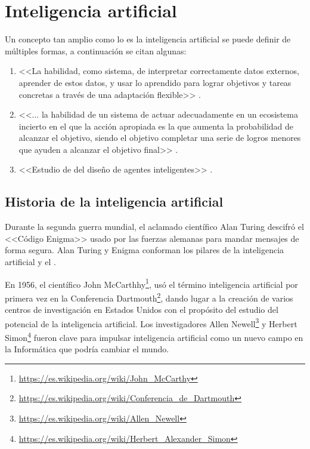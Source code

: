 
\section{Inteligencia artificial}

Un concepto tan amplio como lo es la inteligencia artificial se puede definir de múltiples formas, a continuación se citan algunas:

\begin{enumerate}
    \item <<La habilidad, como sistema, de interpretar correctamente datos externos, aprender de estos datos, y usar lo aprendido para lograr objetivos y tareas concretas a través de una adaptación flexible>> \cite{kaplan_haenlein_2019}.
    \item <<... la habilidad de un sistema de actuar adecuadamente en un ecosistema incierto en el que la acción apropiada es la que aumenta la probabilidad de alcanzar el objetivo, siendo el objetivo completar una serie de logros menores que ayuden a alcanzar el objetivo final>> \cite{albus_1991}.
    \item <<Estudio de del diseño de agentes inteligentes>> \cite{poole_mackworth_goebel_1998}.
\end{enumerate}

\subsection{Historia de la inteligencia artificial}
Durante la segunda guerra mundial, el aclamado científico Alan Turing descifró el <<Código Enigma>> usado por las fuerzas alemanas para mandar mensajes de forma segura. Alan Turing y Enigma conforman los pilares de la inteligencia artificial y el .

En 1956, el científico John McCarthhy\footnote{\url{https://es.wikipedia.org/wiki/John\_McCarthy}}, usó el término inteligencia artificial por primera vez en la Conferencia Dartmouth\footnote{\url{https://es.wikipedia.org/wiki/Conferencia\_de\_Dartmouth}}, dando lugar a la creación de varios centros de investigación en Estados Unidos con el propósito del estudio del potencial de la inteligencia artificial. Los investigadores Allen Newell\footnote{\url{https://es.wikipedia.org/wiki/Allen\_Newell}} y Herbert Simon\footnote{\url{https://es.wikipedia.org/wiki/Herbert\_Alexander\_Simon}}  fueron clave para impulsar inteligencia artificial como un nuevo campo en la Informática que podría cambiar el mundo.

